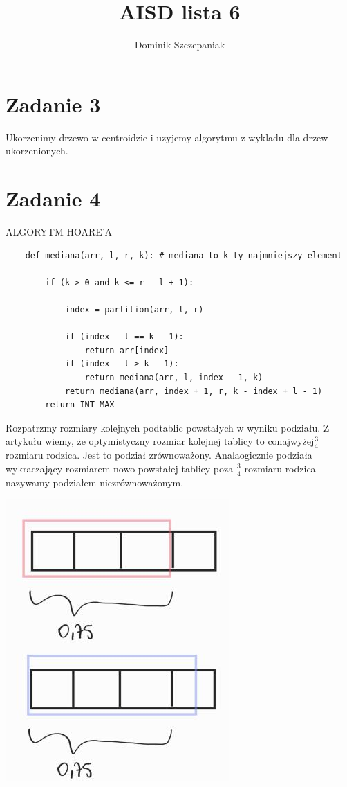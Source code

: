\documentclass[12pt]{article}
\title{AISD lista 6}
\author{Dominik Szczepaniak}
\begin{document}
\maketitle

\bgroup\obeylines

\section{Zadanie 3}
Ukorzenimy drzewo w centroidzie i uzyjemy algorytmu z wykladu dla drzew ukorzenionych.

\section{Zadanie 4}


ALGORYTM HOARE'A
\begin{lstlisting}
    def mediana(arr, l, r, k): # mediana to k-ty najmniejszy element

        if (k > 0 and k <= r - l + 1):

            index = partition(arr, l, r)
            
            if (index - l == k - 1):
                return arr[index]
            if (index - l > k - 1):
                return mediana(arr, l, index - 1, k)
            return mediana(arr, index + 1, r, k - index + l - 1)
        return INT_MAX
\end{lstlisting}

Rozpatrzmy rozmiary kolejnych podtablic powstałych w wyniku podziału.
Z artykułu wiemy, że optymistyczny rozmiar kolejnej tablicy to conajwyżej$\frac{3}{4}$ rozmiaru rodzica. Jest to podział zrównoważony.
Analaogicznie podziała wykraczający rozmiarem nowo powstałej tablicy poza $\frac{3}{4}$ rozmiaru rodzica nazywamy podziałem niezrównoważonym. 

\includegraphics[scale=0.5]{zad4_1.png}
\end{document}
